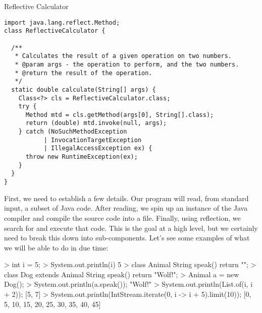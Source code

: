 \begin{cl}[]{Reflective Calculator}
\begin{lstlisting}[language=MyJava]
import java.lang.reflect.Method;
class ReflectiveCalculator {

  /**
   * Calculates the result of a given operation on two numbers.
   * @param args - the operation to perform, and the two numbers.
   * @return the result of the operation.
   */
  static double calculate(String[] args) {
    Class<?> cls = ReflectiveCalculator.class;
    try {
      Method mtd = cls.getMethod(args[0], String[].class);
      return (double) mtd.invoke(null, args);
    } catch (NoSuchMethodException
           | InvocationTargetException
           | IllegalAccessException ex) {
      throw new RuntimeException(ex);
    }
  }
}
\end{lstlisting}
\end{cl}


First, we need to establish a few details. Our program will read, from standard input, a subset of Java code. After reading, we spin up an instance of the Java compiler and compile the source code into a  file. Finally, using reflection, we search for and execute that code. This is the goal at a high level, but we certainly need to break this down into sub-components. Let's see some examples of what we will be able to do in due time:

\begin{verbnobox}[\small]
> int i = 5;
> System.out.println(i)
5
> class Animal { String speak() { return ""; }}
> class Dog extends Animal { String speak() { return "Wolf!"; }}
> Animal a = new Dog();
> System.out.println(a.speak());
"Wolf!"
> System.out.println(List.of(i, i + 2));
[5, 7]
> System.out.println(IntStream.iterate(0, i -> i + 5).limit(10));
[0, 5, 10, 15, 20, 25, 30, 35, 40, 45]
\end{verbnobox}

